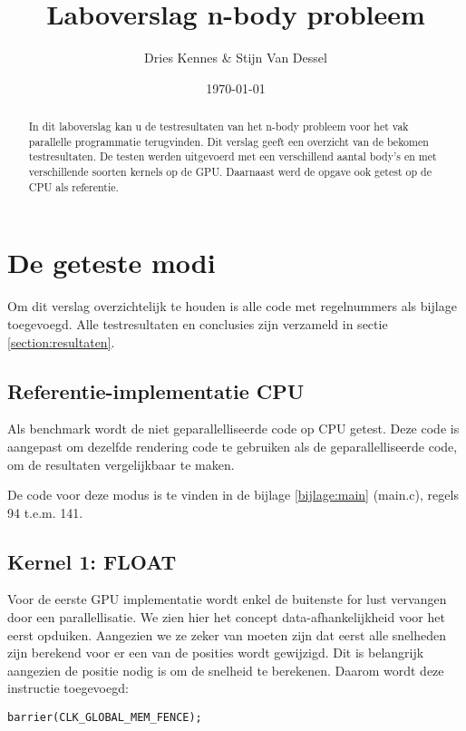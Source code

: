 \documentclass[a4paper]{article}
\title{Laboverslag n-body probleem}
\author{Dries Kennes \& Stijn Van Dessel}
\date{\today{}}
\begin{document}
\maketitle

\begin{abstract}
In dit laboverslag kan u de testresultaten van het n-body probleem voor het vak parallelle programmatie terugvinden. Dit verslag geeft een overzicht van de bekomen testresultaten. 
De testen werden uitgevoerd met een verschillend aantal body's en met verschillende soorten kernels op de GPU. Daarnaast werd de opgave ook getest op de CPU als referentie.
\end{abstract}

\section{De geteste modi}

Om dit verslag overzichtelijk te houden is alle code met regelnummers als bijlage toegevoegd. Alle testresultaten en conclusies zijn verzameld in sectie \ref{section:resultaten}.

\subsection{Referentie-implementatie CPU}

Als benchmark wordt de niet geparallelliseerde code op CPU getest. Deze code is aangepast om dezelfde rendering code te gebruiken als de geparallelliseerde code, om de resultaten vergelijkbaar te maken.

De code voor deze modus is te vinden in de bijlage \ref{bijlage:main} (main.c), regels 94 t.e.m. 141.

\subsection{Kernel 1: FLOAT}

Voor de eerste GPU implementatie wordt enkel de buitenste for lust vervangen door een parallellisatie. We zien hier het concept data-afhankelijkheid voor het eerst opduiken.
Aangezien we ze zeker van moeten zijn dat eerst alle snelheden zijn berekend voor er een van de posities wordt gewijzigd. Dit is belangrijk aangezien de positie nodig is om de snelheid te berekenen. Daarom wordt deze instructie toegevoegd:

\begin{lstlisting}
barrier(CLK_GLOBAL_MEM_FENCE);
\end{lstlisting}
\end{document}
